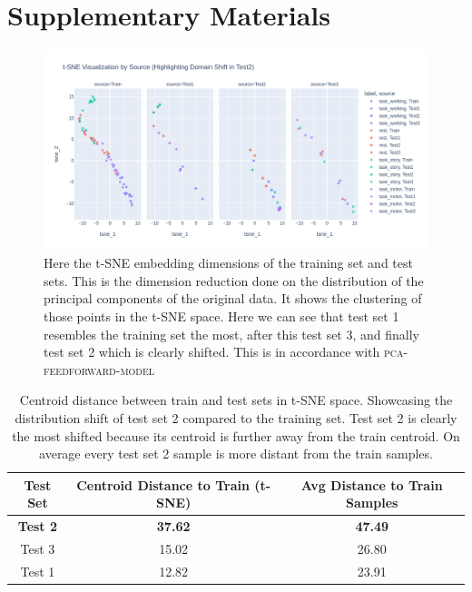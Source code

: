 \documentclass[conference]{IEEEtran}
\begin{document}
\section*{Supplementary Materials}
\begin{figure}[H]
    \centering
    \includegraphics[scale=.5]{figures/supplementary_distribution shift test set 2.png}
    \caption{Here the t-SNE  embedding dimensions of the training set and test sets. This is the dimension reduction done on the distribution of the principal components of the original data. It shows the clustering of those points in the t-SNE space. Here we can see that test set 1 resembles the training set the most, after this test set 3, and finally test set 2 which is clearly shifted. This is in accordance with \textsc{pca-feedforward-model}}
    \label{fig:tsne_distribution_shift}
\end{figure}

\begin{table}[H]
    \centering
    \begin{tabular}{|c|c|c|}
        \hline
        Test Set & Centroid Distance to Train (t-SNE) & Avg Distance to Train Samples \\
        \hline
        \textbf{Test 2} & \textbf{37.62} & \textbf{47.49} \\
        Test 3 & 15.02 & 26.80 \\
        Test 1 & 12.82 & 23.91 \\
        \hline
    \end{tabular}
    \caption{Centroid distance between train and test sets in t-SNE space. Showcasing the distribution shift of test set 2 compared to the training set. Test set 2 is clearly the most shifted because its centroid is further away from the train centroid. On average every test set 2 sample is more distant from the train samples.}
    \label{tab:centroid_distance}
\end{table}
\end{document}
